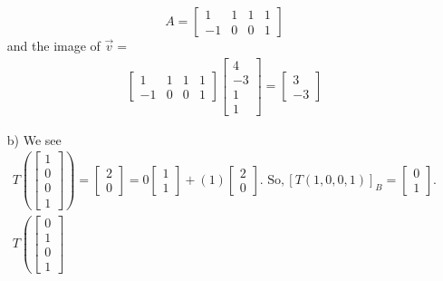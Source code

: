 \documentclass[a4paper,12pt]{article}
\begin{document}
\begin{itemize}
\[A=
\begin{bmatrix}
    1&1&1&1\\
    -1&0&0&1
\end{bmatrix}
\]
and the image of $\vec{v}=$
\begin{align*}
    \begin{bmatrix}
    1&1&1&1\\
    -1&0&0&1
\end{bmatrix}
\begin{bmatrix}
            4\\
            -3\\
            1\\
            1
        \end{bmatrix}= \begin{bmatrix}
            3\\
            -3
        \end{bmatrix}
\end{align*} 
    \item[b)] We see
    \begin{align*}
        T\left(
            \begin{bmatrix}
                1\\
                0\\
                0\\
                1
            \end{bmatrix}
        \right) = \begin{bmatrix}
            2\\
            0
        \end{bmatrix} = 0 \begin{bmatrix}
          1 \\
          1 
        \end{bmatrix} + (1)\begin{bmatrix}
            2\\
            0
        \end{bmatrix}.\text{ So}, [T(1,0,0,1)]_B= \begin{bmatrix}
            0\\
            1
        \end{bmatrix}.\\
        T\left(
            \begin{bmatrix}
                0\\
                1\\
                0\\
                1
            \end{bmatrix}

\end{align*}
\end{itemize}
\end{document}
